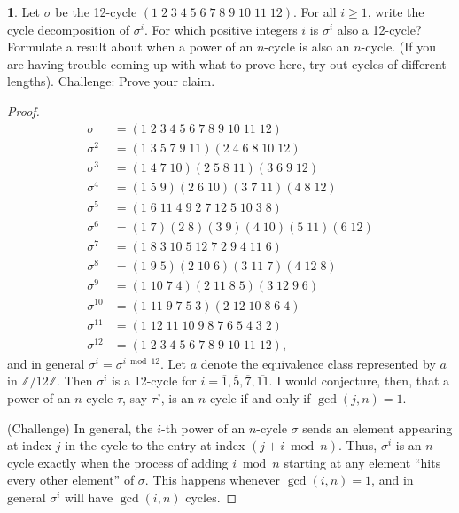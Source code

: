 \documentclass[12pt]{article}
\theoremstyle{definition}
\newtheorem{ex}{}
\begin{document}
\begin{ex}
	Let $\sigma$ be the 12-cycle $(1\;2\;3\;4\;5\;6\;7\;8\;9\;10\;11\;12)$.
	For all $i \geq 1$, write the cycle decomposition of $\sigma^i$.
	For which positive integers $i$ is $\sigma^i$ also a 12-cycle?
	Formulate a result about when a power of an $n$-cycle is also an $n$-cycle.
	(If you are having trouble coming up with what to prove here, try out cycles of different lengths).
	Challenge: Prove your claim.
\end{ex}
\begin{proof}
	\begin{align*}
		\sigma      & = (1\;2\;3\;4\;5\;6\;7\;8\;9\;10\;11\;12)  \\
		\sigma^2    & = (1\;3\;5\;7\;9\;11)(2\;4\;6\;8\;10\;12)  \\
		\sigma^3    & = (1\;4\;7\;10)(2\;5\;8\;11)(3\;6\;9\;12)  \\
		\sigma^4    & = (1\;5\;9)(2\;6\;10)(3\;7\;11)(4\;8\;12)  \\
		\sigma^5    & = (1\;6\;11\;4\;9\;2\;7\;12\;5\;10\;3\;8)  \\
		\sigma^6    & = (1\;7)(2\;8)(3\;9)(4\;10)(5\;11)(6\;12)  \\
		\sigma^7    & = (1\;8\;3\;10\;5\;12\;7\;2\;9\;4\;11\;6)  \\
		\sigma^8    & = (1\;9\;5)(2\;10\;6)(3\;11\;7)(4\;12\;8)  \\
		\sigma^9    & = (1\;10\;7\;4)(2\;11\;8\;5)(3\;12\;9\;6)  \\
		\sigma^{10} & = (1\;11\;9\;7\;5\;3)(2\;12\;10\;8\;6\;4)  \\
		\sigma^{11} & = (1\;12\;11\;10\;9\;8\;7\;6\;5\;4\;3\;2)  \\
		\sigma^{12} & = (1\;2\;3\;4\;5\;6\;7\;8\;9\;10\;11\;12),
	\end{align*}
	and in general $\sigma^i = \sigma^{i \bmod 12}$.
	Let $\overline{a}$ denote the equivalence class represented by $a$ in $\mathbb{Z}/12 \mathbb{Z}$.
	Then $\sigma^i$ is a 12-cycle for $i = \overline{1}, \overline{5}, \overline{7}, \overline{11}$.
	I would conjecture, then, that a power of an $n$-cycle $\tau$, say $\tau^j$, is an $n$-cycle if and only if $\gcd(j, n) = 1$.

	(Challenge) In general, the $i$-th power of an $n$-cycle $\sigma$ sends an element appearing at index $j$ in the cycle to the entry at index $(j+i \bmod n)$.
  Thus, $\sigma^i$ is an $n$-cycle exactly when the process of adding $i \bmod n$ starting at any element ``hits every other element'' of $\sigma$.
  This happens whenever $\gcd(i, n) = 1$, and in general $\sigma^i$ will have $\gcd(i, n)$ cycles.
\end{proof}
\end{document}
